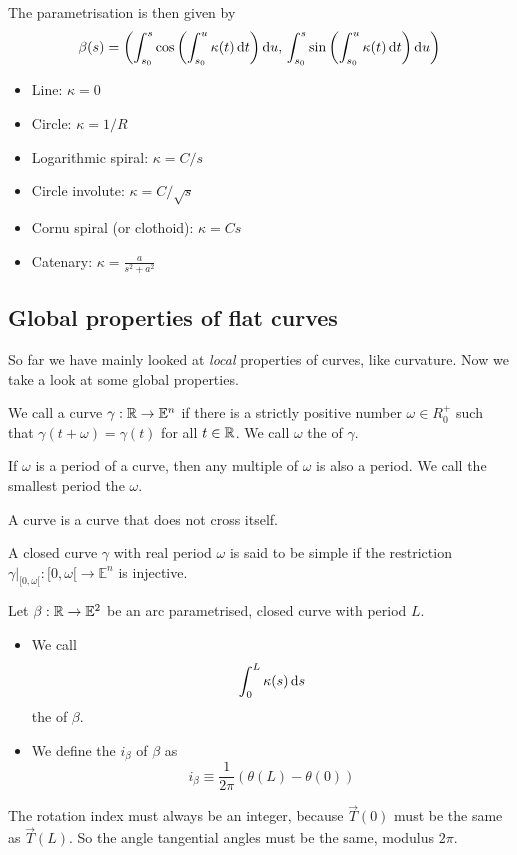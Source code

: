 The parametrisation is then given by
\[ \beta(s) = \left(\int_{s_0}^s\cos\left(\int_{s_0}^u\kappa(t)\operatorname{d \!}{t}\right) \operatorname{d \!}{u},\, \int^s_{s_0}\sin\left(\int_{s_0}^u\kappa(t)\operatorname{d \!}{t}\right) \operatorname{d \!}{u}\right) \]

\begin{example}
\begin{itemize}
\item Line: $\kappa = 0$
\item Circle: $\kappa = 1/R$
\item Logarithmic spiral: $\kappa = C / s$
\item Circle involute: $\kappa = C / \sqrt{s}$
\item Cornu spiral (or clothoid): $\kappa = Cs$
\item Catenary: $\kappa = \frac{a}{s^2 + a^2}$
\end{itemize}
\end{example}

\subsection{Global properties of flat curves}
So far we have mainly looked at \textit{local} properties of curves, like curvature. Now we take a look at some global properties.

\begin{definition}
We call a curve $\gamma:\mathbb{R}\to\mathbb{E}^n$  if there is a strictly positive number $\omega \in R_0^+$ such that $\gamma(t+\omega) = \gamma(t)$ for all $t\in \mathbb{R}$. We call $\omega$ the  of $\gamma$.

If $\omega$ is a period of a curve, then any multiple of $\omega$ is also a period. We call the smallest period the  $\omega$.
\end{definition}

\begin{definition}
A  curve is a curve that does not cross itself. 
\end{definition}
A closed curve $\gamma$ with real period $\omega$ is said to be simple if the restriction $\gamma|_{[0,\omega[}: [0,\omega[ \to \mathbb{E}^n $ is injective.

\begin{definition}
Let $\beta:\mathbb{R} \to \mathbb{E}^2$ be an arc parametrised, closed curve with period $L$.
\begin{itemize}
\item We call
\[ \int_0^L \kappa(s) \operatorname{d \!}{s} \]
the  of $\beta$.
\item We define the  $i_\beta$ of $\beta$ as
\[ i_\beta \equiv \frac{1}{2\pi}\left(\theta(L) - \theta(0)\right) \]
\end{itemize}
\end{definition}
The rotation index must always be an integer, because $\vec{T}(0)$ must be the same as $\vec{T}(L)$. So the angle tangential angles must be the same, modulus $2\pi$.

